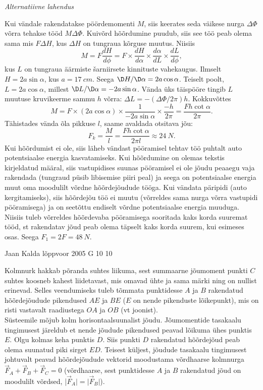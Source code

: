 \documentclass[11pt, twoside]{article}
\begin{document}
{{\vspace{0.5\baselineskip}

\emph{Alternatiivne lahendus}

Kui vändale rakendatakse pöördemomenti $M$, siis keerates seda
väikese nurga $\Delta\Phi$ võrra tehakse tööd $M\Delta\Phi$. Kuivõrd hõõrdumine puudub, siis see
töö peab olema sama mis $F\Delta H$, kus $\Delta H$ on tungraua kõrguse muutus. Niisiis
\[
M=F \frac{d H}{d \phi}=F \times \frac{d H}{d \alpha} \times \frac{d \alpha}{d L} \times \frac{d L}{d \phi},
\]
kus $L$ on tungraua äärmiste šarniirsete kinnituste vahekaugus. Ilmselt $H = 2a \sin\alpha$,
kus $a = \SI{17}{cm}$. Seega $\D H/\D\alpha = 2a \cos\alpha$. Teiselt poolt, $L = 2a \cos\alpha$, millest $\D L/\D\alpha =
-2a \sin\alpha$. Vända üks täispööre tingib $L$ muutuse kruvikeerme sammu $h$ võrra: $\Delta L =
-(\Delta\Phi/2\pi)h$. Kokkuvõttes
\[
M=F \times(2 a \cos \alpha) \times \frac{1}{-2 a \sin \alpha} \times \frac{-h}{2 \pi}=\frac{F h \cot \alpha}{2 \pi}.
\]
Tähistades vända õla pikkuse $l$, saame avaldada otsitava jõu:
\[
F_{k}=\frac{M}{l}=\frac{F h \cot \alpha}{2 \pi l} \approx \SI{24}{N}.
\]
\osa Kui hõõrdumist ei ole, siis läheb vändast pööramisel tehtav töö puhtalt auto
potentsiaalse energia kasvatamiseks. Kui hõõrdumine on olemas tekstis kirjeldatud
määral, siis vastupidises suunas pööramisel ei ole jõudu peaaegu vaja rakendada
(tungraud püsib libisemise piiri peal) ja seega on potentsiaalse energia muut oma
moodulilt võrdne hõõrdejõudude tööga. Kui vändata päripidi (auto kergitamiseks),
siis hõõrdejõu töö ei muutu (võrreldes sama nurga võrra vastupidi pööramisega) ja
on seetõttu endiselt võrdne potentsiaalse energia muuduga. Niisiis tuleb võrreldes
hõõrdevaba pööramisega sooritada kaks korda suuremat tööd, st rakendatav jõud
peab olema täpselt kaks korda suurem, kui esimeses osas. Seega $F_1 = 2F = \SI{48}{N}$.
\fi
}

{Jaan Kalda} %
{lõppvoor} %
{2005} %
{G 10} %
{10} %
{

\ifSolution
\osa Kolmnurk hakkab põranda suhtes liikuma, sest summaarne jõumoment punkti $C$ suhtes koosneb kahest liidetavast, mis omavad ühte ja sama märki ning on nullist erinevad. Selles veendumiseks tuleb tõmmata punktidesse $A$ ja $B$ rakendatud hõõrdejõudude pikendused $AE$ ja $BE$ ($E$ on nende pikenduste lõikepunkt), mis on risti vastavalt raadiustega $OA$ ja $OB$ (vt joonist).\\
\osa Süsteemile mõjub kolm horisontaalsuunalist jõudu. Jõumomentide tasakaalu tingimusest järeldub et nende jõudude pikendused peavad lõikuma ühes punktis $E$. Olgu kolmas keha punktis $D$. Siis punkti $D$ rakendatud hõõrdejõud peab olema suunatud piki sirget $ED$. Teisest küljest, jõudude tasakaalu tingimusest johtuvalt peavad hõõrdejõudude vektorid moodustama võrdhaarse kolmnurga $\vec F_A+\vec F_B+\vec F_C = 0$ (võrdhaarse, sest punktidesse $A$ ja $B$ rakendatud jõud on moodulilt võrdsed, |$\vec F_A| = |\vec F_B|$).

}}
\end{document}
